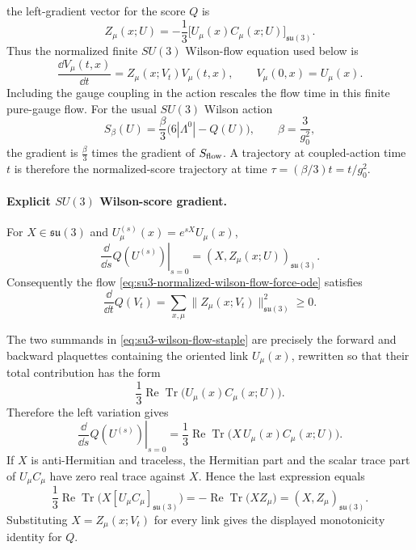 the left-gradient vector for the score \(Q\) is
\begin{equation}
  Z_\mu(x;U)
  =
  -\frac13\bigl[U_\mu(x)C_\mu(x;U)\bigr]_{\mathfrak{su}(3)}.
  \label{eq:su3-wilson-flow-force}
\end{equation}
Thus the normalized finite \(SU(3)\) Wilson-flow equation used below is
\begin{equation}
  \frac{\dd V_\mu(t,x)}{\dd t}
  =
  Z_\mu(x;V_t)V_\mu(t,x),
  \qquad
  V_\mu(0,x)=U_\mu(x).
  \label{eq:su3-normalized-wilson-flow-force-ode}
\end{equation}
Including the gauge coupling in the action rescales the flow time in this
finite pure-gauge flow.  For the usual \(SU(3)\) Wilson action
\[
  S_\beta(U)=\frac{\beta}{3}\bigl(6|\Lambda^0|-Q(U)\bigr),
  \qquad \beta=\frac{3}{g_0^2},
\]
the gradient is \(\frac{\beta}{3}\) times the gradient of
\(S_{\rm flow}\).  A trajectory at coupled-action time \(t\) is therefore the
normalized-score trajectory at time \(\tau=(\beta/3)t=t/g_0^2\).

\paragraph{Explicit \(SU(3)\) Wilson-score gradient.}
For \(X\in\mathfrak{su}(3)\) and
\(U_\mu^{(s)}(x)=e^{sX}U_\mu(x)\),
\[
  \left.
  \frac{\dd}{\dd s}Q(U^{(s)})\right|_{s=0}
  =
  (X,Z_\mu(x;U))_{\mathfrak{su}(3)} .
\]
Consequently the flow \eqref{eq:su3-normalized-wilson-flow-force-ode}
satisfies
\[
  \frac{\dd}{\dd t}Q(V_t)
  =
  \sum_{x,\mu}\|Z_\mu(x;V_t)\|_{\mathfrak{su}(3)}^2
  \ge0 .
\]

The two summands in \eqref{eq:su3-wilson-flow-staple} are precisely the
forward and backward plaquettes containing the oriented link \(U_\mu(x)\),
rewritten so that their total contribution has the form
\[
  \frac13\operatorname{Re}\operatorname{Tr}
  \bigl(U_\mu(x)C_\mu(x;U)\bigr).
\]
Therefore the left variation gives
\[
  \left.
  \frac{\dd}{\dd s}Q(U^{(s)})\right|_{s=0}
  =
  \frac13\operatorname{Re}\operatorname{Tr}
  \bigl(X\,U_\mu(x)C_\mu(x;U)\bigr).
\]
If \(X\) is anti-Hermitian and traceless, the Hermitian part and the scalar
trace part of \(U_\mu C_\mu\) have zero real trace against \(X\).  Hence the
last expression equals
\[
  \frac13\operatorname{Re}\operatorname{Tr}
  \bigl(X[U_\mu C_\mu]_{\mathfrak{su}(3)}\bigr)
  =
  -\operatorname{Re}\operatorname{Tr}\bigl(XZ_\mu\bigr)
  =
  (X,Z_\mu)_{\mathfrak{su}(3)} .
\]
Substituting \(X=Z_\mu(x;V_t)\) for every link gives the displayed
monotonicity identity for \(Q\).

